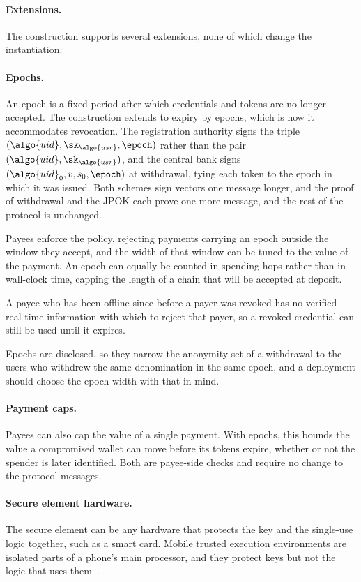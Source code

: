 \paragraph{Extensions.} The construction supports several extensions, none of
which change the instantiation.

\paragraph{Epochs.} An epoch is a fixed period after which credentials and tokens are no longer
accepted. The construction extends to expiry by epochs, which is how it
accommodates revocation. The registration authority signs the triple
$(\algo{uid}, \sk_{\algo{usr}},\allowbreak \epoch)$ rather than the pair
$(\algo{uid}, \sk_{\algo{usr}})$, and the central bank signs
$(\algo{uid}_0,\allowbreak v,\allowbreak s_0,\allowbreak \epoch)$ at
withdrawal, tying each token to the epoch in which it was issued. Both schemes
sign vectors one message longer, and the proof of withdrawal and the JPOK each
prove one more message, and the rest of the protocol is unchanged.

Payees enforce the policy, rejecting payments carrying an epoch outside the
window they accept, and the width of that window can be tuned to the value of
the payment. An epoch can equally be counted in spending hops rather than in
wall-clock time, capping the length of a chain that will be accepted at
deposit.

A payee who has been offline since before a payer was revoked has no verified
real-time information with which to reject that payer, so a revoked
credential can still be used until it expires.

Epochs are disclosed, so they narrow the anonymity set of a withdrawal to the
users who withdrew the same denomination in the same epoch, and a deployment
should choose the epoch width with that in mind.

\paragraph{Payment caps.} Payees can also cap the value of a single payment. With epochs, this bounds
the value a compromised wallet can move before its tokens expire, whether or
not the spender is later identified. Both are payee-side checks and require no change to the protocol
messages.

\paragraph{Secure element hardware.} The secure element can be any hardware that protects the key and the single-use
logic together, such as a smart card. Mobile trusted execution environments are
isolated parts of a phone's main processor, and they protect keys but not the
logic that uses them~\cite{trustzone,secureenclave,javacard,mifare}.

